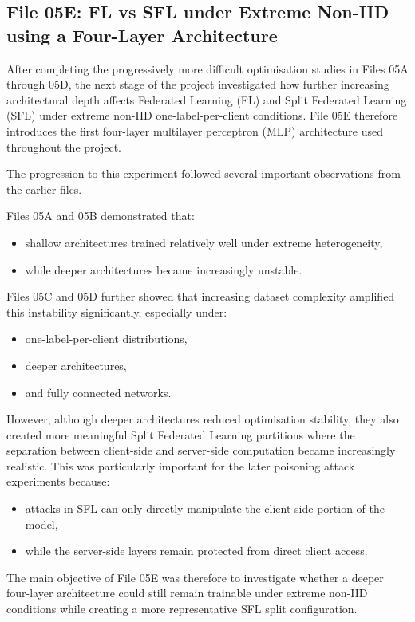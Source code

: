 \subsection*{File 05E: FL vs SFL under Extreme Non-IID using a Four-Layer Architecture}

After completing the progressively more difficult optimisation studies in Files 05A through 05D, the next stage of the project investigated how further increasing architectural depth affects Federated Learning (FL) and Split Federated Learning (SFL) under extreme non-IID one-label-per-client conditions. File 05E therefore introduces the first four-layer multilayer perceptron (MLP) architecture used throughout the project.

The progression to this experiment followed several important observations from the earlier files.

Files 05A and 05B demonstrated that:
\begin{itemize}
    \item shallow architectures trained relatively well under extreme heterogeneity,
    \item while deeper architectures became increasingly unstable.
\end{itemize}

Files 05C and 05D further showed that increasing dataset complexity amplified this instability significantly, especially under:
\begin{itemize}
    \item one-label-per-client distributions,
    \item deeper architectures,
    \item and fully connected networks.
\end{itemize}

However, although deeper architectures reduced optimisation stability, they also created more meaningful Split Federated Learning partitions where the separation between client-side and server-side computation became increasingly realistic. This was particularly important for the later poisoning attack experiments because:
\begin{itemize}
    \item attacks in SFL can only directly manipulate the client-side portion of the model,
    \item while the server-side layers remain protected from direct client access.
\end{itemize}

The main objective of File 05E was therefore to investigate whether a deeper four-layer architecture could still remain trainable under extreme non-IID conditions while creating a more representative SFL split configuration.

